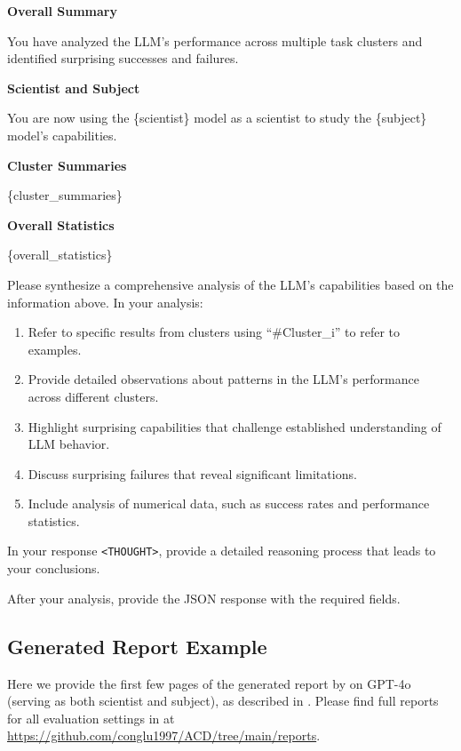 \begin{tcolorbox}[breakable,boxrule=0.5pt,sharp corners,fontupper=\small,
colback=orange!5!white, colframe=orange!80!black, title={Overall Summary Prompt}]
\textbf{Overall Summary}

You have analyzed the LLM's performance across multiple task clusters and identified surprising successes and failures.

\textbf{Scientist and Subject}

You are now using the \{scientist\} model as a scientist to study the \{subject\} model's capabilities.

\textbf{Cluster Summaries}

\{cluster\_summaries\}

\textbf{Overall Statistics}

\{overall\_statistics\}

Please synthesize a comprehensive analysis of the LLM's capabilities based on the information above. In your analysis:
\begin{enumerate}[leftmargin=2em]
    \item Refer to specific results from clusters using ``\#Cluster\_i'' to refer to examples.
    \item Provide detailed observations about patterns in the LLM's performance across different clusters.
    \item Highlight surprising capabilities that challenge established understanding of LLM behavior.
    \item Discuss surprising failures that reveal significant limitations.
    \item Include analysis of numerical data, such as success rates and performance statistics.
\end{enumerate}

In your response \texttt{<THOUGHT>}, provide a detailed reasoning process that leads to your conclusions.

After your analysis, provide the JSON response with the required fields.
\end{tcolorbox}

\subsection{Generated Report Example}
\label{appsubsec:report_example}

Here we provide the first few pages of the generated report by \ouralgolong on GPT-4o (serving as both scientist and subject), as described in .
Please find full reports for all evaluation settings in  at \url{https://github.com/conglu1997/ACD/tree/main/reports}.


